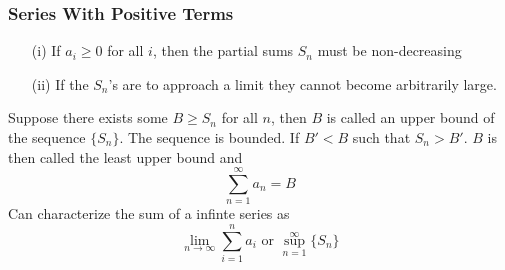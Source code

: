 \documentclass{beamer}
\begin{document}
\begin{frame}
\frametitle{Series With Positive Terms}
\begin{itemize}
	\item[(i)] If $a_i \geq 0$ for all $i$, then the partial sums $S_n$ must be non-decreasing
	\item[(ii)] If the $S_n$'s are to approach a limit they cannot become arbitrarily large.
\end{itemize}
Suppose there exists some $B \geq S_n$ for all $n$, then $B$ is called an upper bound of the sequence $\{S_n\}$. The sequence is bounded. If $B' < B$ such that $S_n > B'$. $B$ is then called the least upper bound and 
$$\sum_{n=1}^\infty a_n = B$$
Can characterize the sum of a infinte series as
$$\lim\limits_{n \to \infty} \sum_{i=1}^n a_i \mbox{ or } \sup_{n=1}^\infty \{S_n\}$$

\end{frame}

%		
%		
%
%
%
%
\end{document}
